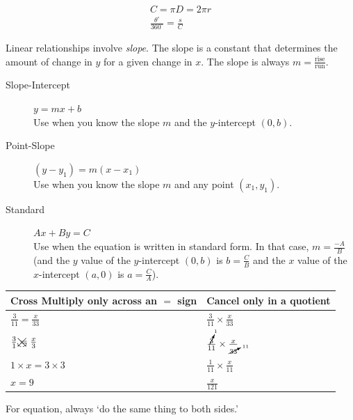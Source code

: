 \documentclass[11pt]{article}%
\begin{document}
\begin{multicols*}{2}
\newcommand\TR{3}
\begin{center}\end{center}
\begin{align*}
C = \pi D = 2 \pi r \\
\boxed{\frac{\theta^{\circ}}{360^{\circ}} = \frac{s}{C}}
\end{align*}

\divider

Linear relationships involve \textit{slope}. The slope is a constant that determines the amount of change in $y$ for a given change in $x$. The slope is always $\boxed{m = \frac{\text{rise}}{\text{run}}}$.

\begin{description}
\item[Slope-Intercept] $\boxed{y = mx + b}$ \\ Use when you know the slope $m$ and the $y$-intercept $\left( 0, b \right)$.
\item[Point-Slope] $\boxed{\left( y - y_{1} \right) = m \left( x - x_{1} \right)}$ \\ Use when you know the slope $m$ and any point $\left( x_{1}, y_{1} \right)$.
\item[Standard] $\boxed{Ax + By = C}$ \\ Use when the equation is written in standard form. In that case, $\boxed{m = \frac{-A}{B}}$ (and the $y$ value of the $y$-intercept $\left( 0, b \right)$ is $b = \frac{C}{B}$ and the $x$ value of the $x$-intercept $\left( a, 0 \right)$ is $a = \frac{C}{A}$).
\end{description}

\divider

\begin{tabu} to \linewidth {X[c]X[c]}
\textbf{Cross Multiply} only across an $=$ sign & \textbf{Cancel} only in a quotient \\\hline
$\frac{3}{11} = \frac{x}{33}$ & $\frac{3}{11} \times \frac{x}{33}$ \\
$\frac{3}{1} \mathrlap{\searrow}\mathrlap{\swarrow}= \frac{x}{3}$  & $\frac{\cancelto{1}{3}}{11} \times \frac{x}{\cancelto{11}{33}}$ \\
$1 \times x = 3 \times 3$ & $\frac{1}{11} \times \frac{x}{11}$ \\
$x = 9$ & $\frac{x}{121}$ \\
\end{tabu}
For  equation, always `do the same thing to both sides.'


\end{multicols*}
\end{document}
